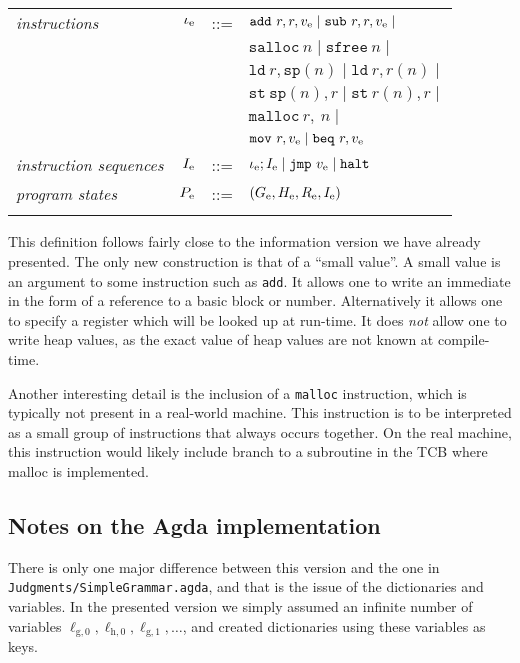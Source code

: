 {\begin{tabular}{lrcl}
\textit{instructions} & $\iota_{\mathrm{e}}$ & ::= & $\mathtt{add}\ r, r, \simple v \mid \mathtt{sub}\ r, r, \simple v \mid$ \\
        &&& $\mathtt{salloc}\ n \mid \mathtt{sfree}\ n \mid$ \\
        &&& $\mathtt{ld}\ r, \mathtt{sp}(n) \mid \mathtt{ld}\ r, r(n) \mid$ \\
        &&& $\mathtt{st}\ \mathtt{sp}(n), r \mid \mathtt{st}\ r(n), r \mid$ \\
        &&& $\mathtt{malloc}\ r,\ n \mid $ \\
        &&& $\mathtt{mov}\ r, \simple v \mid \mathtt{beq}\ r, \simple v$ \\
\textit{instruction sequences} & $I_{\mathrm{e}}$ & ::= & $\iota_{\mathrm{e}} ; I_{\mathrm{e}} \mid \mathtt{jmp}\ v_{\mathrm{e}} \mid \mathtt{halt}$ \\
\textit{program states} & $P_{\mathrm{e}}$ & ::= & $(G_{\mathrm{e}}, H_{\mathrm{e}}, R_{\mathrm{e}}, I_{\mathrm{e}})$ \\\\
\end{tabular}
}

This definition follows fairly close to the information version we have already
presented. The only new construction is that of a ``small value''. A small value
is an argument to some instruction such as \texttt{add}. It allows one to write
an immediate in the form of a reference to a basic block or
number. Alternatively it allows one to specify a register which will be looked
up at run-time. It does \emph{not} allow one to write heap values, as the exact
value of heap values are not known at compile-time.

Another interesting detail is the inclusion of a \texttt{malloc} instruction,
which is typically not present in a real-world machine. This instruction is to
be interpreted as a small group of instructions that always occurs together. On
the real machine, this instruction would likely include branch to a subroutine
in the TCB where malloc is implemented.

\subsection{Notes on the Agda implementation}

There is only one major difference between this version and the one in
\texttt{Judgments/SimpleGrammar.agda}, and that is the issue of the dictionaries
and variables. In the presented version we simply assumed an infinite number of
variables
$\ell_{\mathrm{g},0}, \ell_{\mathrm{h},0}, \ell_{\mathrm{g},1}, \dots$, and
created dictionaries using these variables as keys.

